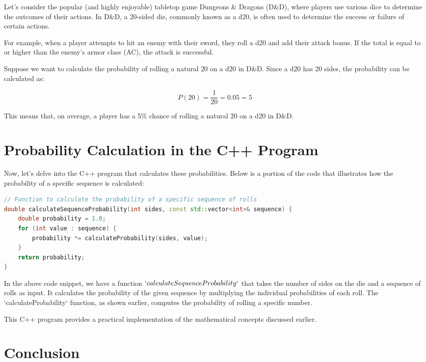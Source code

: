 \documentclass{article}
\begin{document}
Let's consider the popular (and highly enjoyable) tabletop game Dungeons \& Dragons (D\&D), where players use
various dice to determine the outcomes of their actions. In D\&D, a 20-sided die, commonly known as a d20, is often
used to determine the success or failure of certain actions.

For example, when a player attempts to hit an enemy with their sword, they roll a d20 and add their attack bonus.
If the total is equal to or higher than the enemy's armor class (AC), the attack is successful.

Suppose we want to calculate the probability of rolling a natural 20 on a d20 in D\&D. Since a d20 has 20 sides, the
probability can be calculated as:

\[
P(20) = \frac{1}{20} = 0.05 = 5%
\]

This means that, on average, a player has a 5\% chance of rolling a natural 20 on a d20 in D\&D.

\section{Probability Calculation in the C++ Program}

Now, let's delve into the C++ program that calculates these probabilities. Below is a portion of the code that
illustrates how the probability of a specific sequence is calculated:

\begin{lstlisting}[language=C++, caption=C++ Code for Probability Calculation]
// Function to calculate the probability of a specific sequence of rolls
double calculateSequenceProbability(int sides, const std::vector<int>& sequence) {
    double probability = 1.0;
    for (int value : sequence) {
        probability *= calculateProbability(sides, value);
    }
    return probability;
}
\end{lstlisting}

In the above code snippet, we have a function $`calculateSequenceProbability`$ that takes the number of sides on
the die and a sequence of rolls as input. It calculates the probability of the given sequence by multiplying
the individual probabilities of each roll. The `calculateProbability` function, as shown earlier, computes
the probability of rolling a specific number.

This C++ program provides a practical implementation of the mathematical concepts discussed earlier.

\section{Conclusion}
\end{document}

